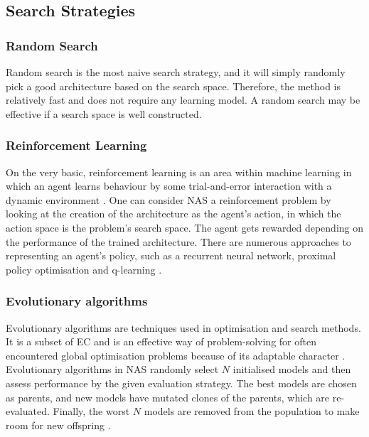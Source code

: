 \subsection{Search Strategies}

\subsubsection{Random Search}
Random search is the most naive search strategy, and it will simply randomly pick a good architecture based on the search space. Therefore, the method is relatively fast and does not require any learning model. A random search may be effective if a search space is well constructed.  

\subsubsection{Reinforcement Learning}
On the very basic, reinforcement learning is an area within machine learning in which an agent learns behaviour by some trial-and-error interaction with a dynamic environment \autocite{kaelbling1996reinforcement}. One can consider \gls{NAS} a reinforcement problem by looking at the creation of the architecture as the agent's action, in which the action space is the problem's search space. The agent gets rewarded depending on the performance of the trained architecture. There are numerous approaches to representing an agent's policy, such as a recurrent neural network, proximal policy optimisation and q-learning \autocite{elsken2019neural}. 

\subsubsection{Evolutionary algorithms}
Evolutionary algorithms are techniques used in optimisation and search methods. It is a subset of \gls{EC} and is an effective way of problem-solving for often encountered global optimisation problems because of its adaptable character \autocite{7955308}. Evolutionary algorithms in \gls{NAS} randomly select $N$ initialised models and then assess performance by the given evaluation strategy. The best models are chosen as parents, and new models have mutated clones of the parents, which are re-evaluated. Finally, the worst $N$ models are removed from the population to make room for new offspring \autocite{https://doi.org/10.48550/arxiv.1703.01041}. 

